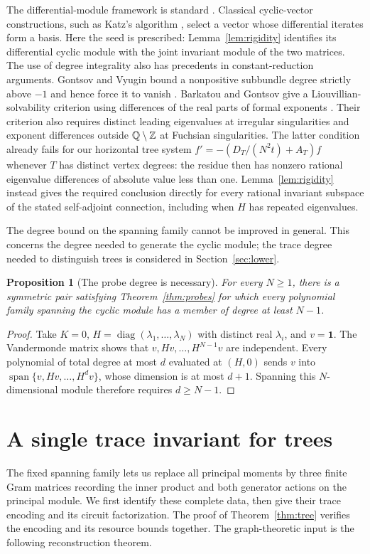\documentclass[11pt,letterpaper]{article}
\newtheorem{proposition}[theorem]{Proposition}
\theoremstyle{definition}\newtheorem{definition}[theorem]{Definition}
\theoremstyle{remark}\newtheorem{remark}[theorem]{Remark}
\DeclareMathOperator{\spanop}{span}\DeclareMathOperator{\im}{im}
\newcommand{\one}{\mathbf1}\newcommand{\M}{\mathcal M}
\begin{document}
The differential-module framework is standard \cite[Chapter~2]{vdPS}.
Classical cyclic-vector constructions, such as Katz's algorithm \cite{Katz},
select a vector whose differential iterates form a basis. Here the seed is
prescribed: Lemma~\ref{lem:rigidity} identifies its differential cyclic module
with the joint invariant module of the two matrices. The use of degree
integrality also has precedents in constant-reduction arguments.
Gontsov and Vyugin bound a nonpositive subbundle degree strictly above $-1$
and hence force it to vanish \cite[Lemma~2]{GV}.
Barkatou and Gontsov give a Liouvillian-solvability criterion using differences
of the real parts of formal exponents \cite[Theorem~2.3]{BG}. Their criterion
also requires distinct leading eigenvalues at irregular singularities and
exponent differences outside $\mathbb Q\setminus\mathbb Z$ at Fuchsian singularities.
The latter condition already fails for our horizontal tree system
$f'=-(D_T/(N^2t)+A_T)f$ whenever $T$ has distinct vertex degrees: the residue
then has nonzero rational eigenvalue differences of absolute value less than
one. Lemma~\ref{lem:rigidity} instead gives the required conclusion directly
for every rational invariant subspace of the stated self-adjoint connection,
including when $H$ has repeated eigenvalues.

The degree bound on the spanning family cannot be improved in general.
This concerns the degree needed to generate the cyclic module; the trace
degree needed to distinguish trees is considered in Section~\ref{sec:lower}.

\begin{proposition}[The probe degree is necessary]\label{prop:probedegree}
For every $N\ge1$, there is a symmetric pair satisfying
Theorem~\ref{thm:probes} for which every polynomial family spanning the cyclic
module has a member of degree at least $N-1$.
\end{proposition}
\begin{proof}
Take $K=0$, $H=\operatorname{diag}(\lambda_1,\ldots,\lambda_N)$ with distinct
real $\lambda_i$, and $v=\one$. The Vandermonde matrix shows that
$v,Hv,\ldots,H^{N-1}v$ are independent. Every polynomial of total degree at
most $d$ evaluated at $(H,0)$ sends $v$ into
$\spanop\{v,Hv,\ldots,H^dv\}$, whose dimension is at most $d+1$.
Spanning this $N$-dimensional module therefore requires $d\ge N-1$.
\end{proof}

\section{A single trace invariant for trees}\label{sec:reconstruction}
The fixed spanning family lets us replace all principal moments by three
finite Gram matrices recording the inner product and both generator actions
on the principal module. We first identify these complete data, then give
their trace encoding and its circuit factorization. The proof of
Theorem~\ref{thm:tree} verifies the encoding and its resource bounds together.
The graph-theoretic input is the following reconstruction theorem.
\end{document}
